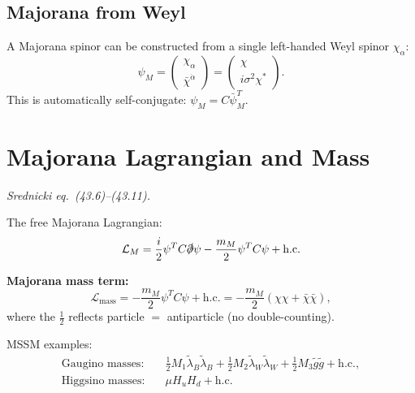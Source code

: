 \subsection{Majorana from Weyl}

A Majorana spinor can be constructed from a single left-handed Weyl spinor $\chi_\alpha$:
\begin{equation}
  \psi_M = \begin{pmatrix}\chi_\alpha \\ \bar\chi^{\dot\alpha}\end{pmatrix}
  = \begin{pmatrix}\chi \\ i\sigma^2\chi^*\end{pmatrix}.
\end{equation}
This is automatically self-conjugate: $\psi_M = C\bar\psi_M^T$.

\section{Majorana Lagrangian and Mass}

\textit{Srednicki eq.\ (43.6)--(43.11).}

The free Majorana Lagrangian:
\begin{equation}
  \mathcal{L}_M = \frac{i}{2}\psi^T C\slashed\partial\psi
               - \frac{m_M}{2}\psi^T C\psi + \text{h.c.}
\end{equation}

\begin{mdframed}[backgroundcolor=blue!5]
\textbf{Majorana mass term:}
\begin{equation}\label{eq:majorana-mass}
  \mathcal{L}_\text{mass} = -\frac{m_M}{2}\psi^T C\psi + \text{h.c.}
  = -\frac{m_M}{2}(\chi\chi + \bar\chi\bar\chi),
\end{equation}
where the $\tfrac{1}{2}$ reflects particle $=$ antiparticle (no double-counting).
\end{mdframed}

MSSM examples:
\begin{align}
  \text{Gaugino masses:} &\quad \frac{1}{2}M_1\tilde\lambda_B\tilde\lambda_B
                                + \frac{1}{2}M_2\tilde\lambda_W\tilde\lambda_W
                                + \frac{1}{2}M_3\tilde g\tilde g + \text{h.c.},\\
  \text{Higgsino masses:} &\quad \mu H_u H_d + \text{h.c.}
\end{align}

